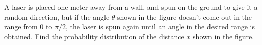 A laser is placed one meter away from a wall, and spun
on the ground to give it a random direction, but if the angle $\theta$ shown in the figure
 doesn't
come out in the range from 0 to $\pi/2$, the laser is spun again until
an angle in the desired range is obtained. Find the probability distribution
of the distance $x$ shown in the figure.\answercheck
